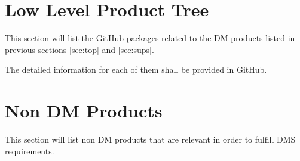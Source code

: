 %


\newpage
\section{Low Level Product Tree}\label{sec:low}

This section will list the GitHub packages related to the DM products listed in previous sections \ref{sec:top} and \ref{sec:sups}.

The detailed information for each of them shall be provided in GitHub.

%


\newpage
\section{Non DM Products}\label{sec:nondm}

This section will list non DM products that are relevant in order to fulfill DMS requirements.
